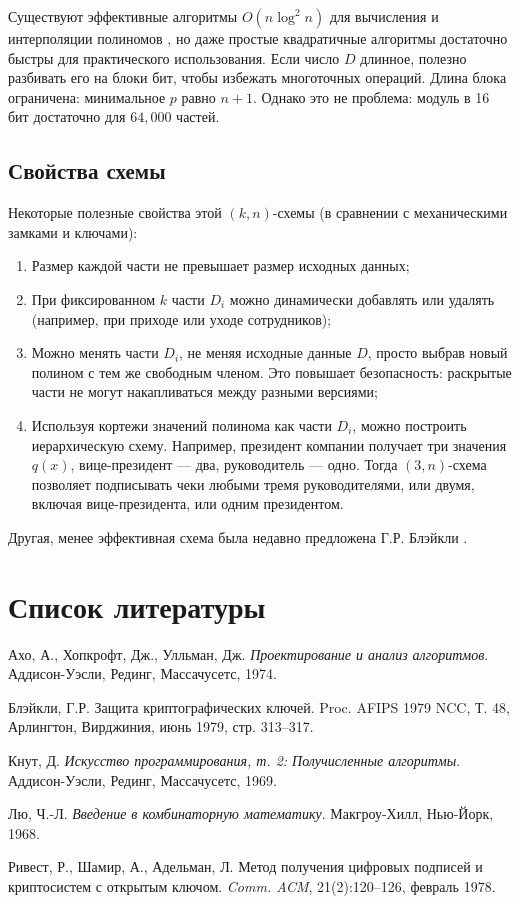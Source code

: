 \documentclass[a4paper,12pt]{article}
\begin{document}
Существуют эффективные алгоритмы $O(n \log^2 n)$ для вычисления и интерполяции полиномов
\cite{aho1974,knuth1969}, но даже простые квадратичные алгоритмы достаточно быстры
для практического использования. Если число $D$ длинное, полезно разбивать его на блоки бит,
чтобы избежать многоточных операций. Длина блока ограничена: минимальное $p$ равно $n+1$.
Однако это не проблема: модуль в 16 бит достаточно для $64{,}000$ частей.

\subsection*{Свойства схемы}

Некоторые полезные свойства этой $(k,n)$-схемы (в сравнении с механическими замками и ключами):

\begin{enumerate}
\item Размер каждой части не превышает размер исходных данных;
\item При фиксированном $k$ части $D_i$ можно динамически добавлять или удалять
(например, при приходе или уходе сотрудников);
\item Можно менять части $D_i$, не меняя исходные данные $D$, просто выбрав новый полином
с тем же свободным членом. Это повышает безопасность: раскрытые части не могут
накапливаться между разными версиями;
\item Используя кортежи значений полинома как части $D_i$, можно построить иерархическую схему.
Например, президент компании получает три значения $q(x)$, вице-президент --- два,
руководитель --- одно. Тогда $(3,n)$-схема позволяет подписывать чеки любыми тремя
руководителями, или двумя, включая вице-президента, или одним президентом.
\end{enumerate}

Другая, менее эффективная схема была недавно предложена Г.Р. Блэйкли \cite{blakley1979}.

\section*{Список литературы}

\begin{thebibliography}{9}

Ахо, А., Хопкрофт, Дж., Улльман, Дж. \textit{Проектирование и анализ алгоритмов}.
Аддисон-Уэсли, Рединг, Массачусетс, 1974.

Блэйкли, Г.Р. Защита криптографических ключей.
Proc. AFIPS 1979 NCC, Т. 48, Арлингтон, Вирджиния, июнь 1979, стр. 313--317.

Кнут, Д. \textit{Искусство программирования, т. 2: Получисленные алгоритмы}.
Аддисон-Уэсли, Рединг, Массачусетс, 1969.

Лю, Ч.-Л. \textit{Введение в комбинаторную математику}. Макгроу-Хилл,
Нью-Йорк, 1968.

Ривест, Р., Шамир, А., Адельман, Л. Метод получения цифровых подписей и
криптосистем с открытым ключом. \textit{Comm. ACM}, 21(2):120--126, февраль 1978.

\end{thebibliography}
\end{document}
